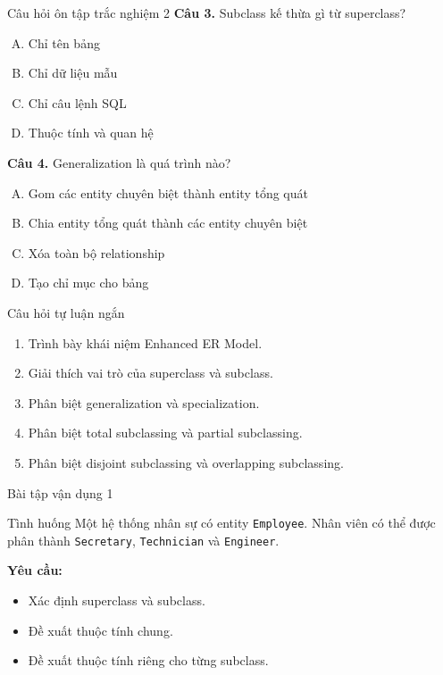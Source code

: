 \documentclass[aspectratio=169,11pt]{beamer}
\newcommand{\codeword}[1]{\texttt{#1}}
\begin{document}
\begin{frame}{Câu hỏi ôn tập trắc nghiệm 2}
\textbf{Câu 3.} Subclass kế thừa gì từ superclass?
\begin{enumerate}[A.]
    \item Chỉ tên bảng
    \item Chỉ dữ liệu mẫu
    \item Chỉ câu lệnh SQL
    \item Thuộc tính và quan hệ
\end{enumerate}

\vspace{0.2cm}
\textbf{Câu 4.} Generalization là quá trình nào?
\begin{enumerate}[A.]
    \item Gom các entity chuyên biệt thành entity tổng quát
    \item Chia entity tổng quát thành các entity chuyên biệt
    \item Xóa toàn bộ relationship
    \item Tạo chỉ mục cho bảng
\end{enumerate}
\end{frame}

\begin{frame}{Câu hỏi tự luận ngắn}
\begin{enumerate}
    \item Trình bày khái niệm Enhanced ER Model.
    \item Giải thích vai trò của superclass và subclass.
    \item Phân biệt generalization và specialization.
    \item Phân biệt total subclassing và partial subclassing.
    \item Phân biệt disjoint subclassing và overlapping subclassing.
\end{enumerate}
\end{frame}

\begin{frame}{Bài tập vận dụng 1}
\begin{block}{Tình huống}
Một hệ thống nhân sự có entity \codeword{Employee}. Nhân viên có thể được phân thành \codeword{Secretary}, \codeword{Technician} và \codeword{Engineer}.
\end{block}

\textbf{Yêu cầu:}
\begin{itemize}
    \item Xác định superclass và subclass.
    \item Đề xuất thuộc tính chung.
    \item Đề xuất thuộc tính riêng cho từng subclass.
\end{itemize}
\end{frame}
\end{document}

